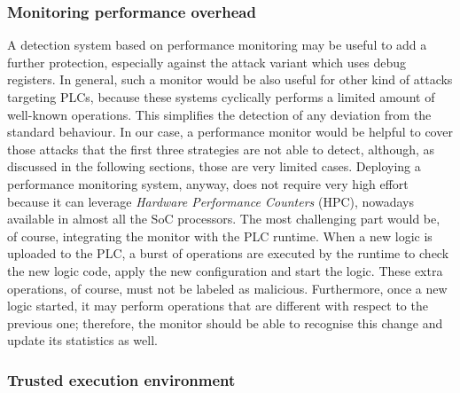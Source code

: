 \subsubsection{Monitoring performance overhead}

A detection system based on performance monitoring may be useful to add a further protection, especially against the attack variant
which uses debug registers. In general, such a monitor would be also useful for other kind of attacks targeting PLCs, because these systems cyclically performs
a limited amount of well-known operations. This simplifies the detection of any deviation from the standard behaviour.
In our case, a performance monitor would be helpful to cover those attacks that the first three strategies are not able to detect,
although, as discussed in the following sections, those are very limited cases.
Deploying a performance monitoring system, anyway, does not require very high effort because it can leverage \emph{Hardware Performance Counters} (HPC),
nowadays available in almost all the SoC processors. The most challenging part would be, of course, integrating the monitor with the PLC runtime.
When a new logic is uploaded to the PLC, a burst of operations are executed by the runtime to check the new logic code, apply the new configuration and start the logic.
These extra operations, of course, must not be labeled as malicious. Furthermore, once a new logic started, it may perform operations that are different
with respect to the previous one; therefore, the monitor should be able to recognise this change and update its statistics as well.


\subsubsection{Trusted execution environment}

